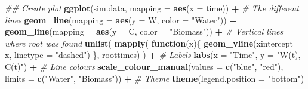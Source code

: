 \documentclass[
]{article}
\newenvironment{Shaded}{\begin{snugshade}}{\end{snugshade}}
\newcommand{\CommentTok}[1]{\textcolor[rgb]{0.56,0.35,0.01}{\textit{#1}}}
\newcommand{\ControlFlowTok}[1]{\textcolor[rgb]{0.13,0.29,0.53}{\textbf{#1}}}
\newcommand{\DataTypeTok}[1]{\textcolor[rgb]{0.13,0.29,0.53}{#1}}
\newcommand{\KeywordTok}[1]{\textcolor[rgb]{0.13,0.29,0.53}{\textbf{#1}}}
\newcommand{\NormalTok}[1]{#1}
\newcommand{\OperatorTok}[1]{\textcolor[rgb]{0.81,0.36,0.00}{\textbf{#1}}}
\newcommand{\StringTok}[1]{\textcolor[rgb]{0.31,0.60,0.02}{#1}}
\begin{document}
\begin{Shaded}
\begin{Highlighting}[numbers=left,,]
\CommentTok{\#\# Create plot}
\KeywordTok{ggplot}\NormalTok{(sim.data, }\DataTypeTok{mapping =} \KeywordTok{aes}\NormalTok{(}\DataTypeTok{x =}\NormalTok{ time)) }\OperatorTok{+}
\StringTok{       }\CommentTok{\# The different lines}
\StringTok{       }\KeywordTok{geom\_line}\NormalTok{(}\DataTypeTok{mapping =} \KeywordTok{aes}\NormalTok{(}\DataTypeTok{y =}\NormalTok{ W, }\DataTypeTok{color =} \StringTok{"Water"}\NormalTok{)) }\OperatorTok{+}
\StringTok{       }\KeywordTok{geom\_line}\NormalTok{(}\DataTypeTok{mapping =} \KeywordTok{aes}\NormalTok{(}\DataTypeTok{y =}\NormalTok{ C, }\DataTypeTok{color =} \StringTok{"Biomass"}\NormalTok{)) }\OperatorTok{+}
\StringTok{       }\CommentTok{\# Vertical lines where root was found}
\StringTok{       }\KeywordTok{unlist}\NormalTok{( }\KeywordTok{mapply}\NormalTok{( }\ControlFlowTok{function}\NormalTok{(x)\{}
         \KeywordTok{geom\_vline}\NormalTok{(}\DataTypeTok{xintercept =}\NormalTok{ x, }\DataTypeTok{linetype =} \StringTok{"dashed"}\NormalTok{)}
\NormalTok{                                   \}, roottimes) ) }\OperatorTok{+}
\StringTok{       }\CommentTok{\# Labels}
\StringTok{       }\KeywordTok{labs}\NormalTok{(}\DataTypeTok{x =} \StringTok{"Time"}\NormalTok{, }\DataTypeTok{y =} \StringTok{"W(t), C(t)"}\NormalTok{) }\OperatorTok{+}
\StringTok{       }\CommentTok{\# Line colours}
\StringTok{       }\KeywordTok{scale\_colour\_manual}\NormalTok{(}\DataTypeTok{values =} \KeywordTok{c}\NormalTok{(}\StringTok{"blue"}\NormalTok{, }\StringTok{"red"}\NormalTok{),}
                           \DataTypeTok{limits =} \KeywordTok{c}\NormalTok{(}\StringTok{"Water"}\NormalTok{, }\StringTok{"Biomass"}\NormalTok{)) }\OperatorTok{+}
\StringTok{       }\CommentTok{\# Theme}
\StringTok{       }\KeywordTok{theme}\NormalTok{(}\DataTypeTok{legend.position =} \StringTok{"bottom"}\NormalTok{)}
\end{Highlighting}
\end{Shaded}
\end{document}
